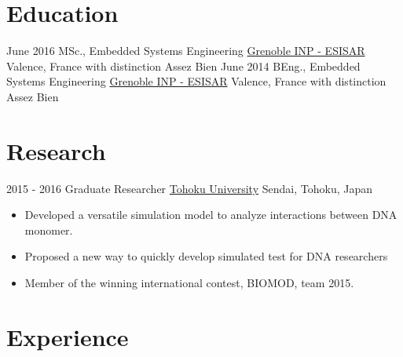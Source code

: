 \documentclass[a4paper]{template} %
\begin{document}
\makeprofile %

\section{Education}

\begin{twenty} %
	\twentyitem
    	{June 2016}
        {MSc., Embedded Systems Engineering}
        {\href{http://esisar.grenoble-inp.fr/}{Grenoble INP - ESISAR}}
        {Valence, France}
        {with distinction Assez Bien}
	\twentyitem
    	{June 2014}
        {BEng., Embedded Systems Engineering}
        {\href{http://esisar.grenoble-inp.fr/}{Grenoble INP - ESISAR}}
        {Valence, France}
        {with distinction Assez Bien}
\end{twenty}


\section{Research}
\begin{twenty}
	\twentyitem
    	{2015 - 2016}
        {Graduate Researcher}
        {\href{http://www.tohoku.ac.jp/en/}{Tohoku University}}
        {Sendai, Tohoku, Japan}
        {
        {\begin{itemize}
        \item Developed a versatile simulation model to analyze interactions between DNA monomer.
        \item Proposed a new way to quickly develop simulated test for DNA researchers
        \item Member of the winning international contest, BIOMOD, team 2015.
    \end{itemize}}
        }
\end{twenty}


\section{Experience}
\end{document}
